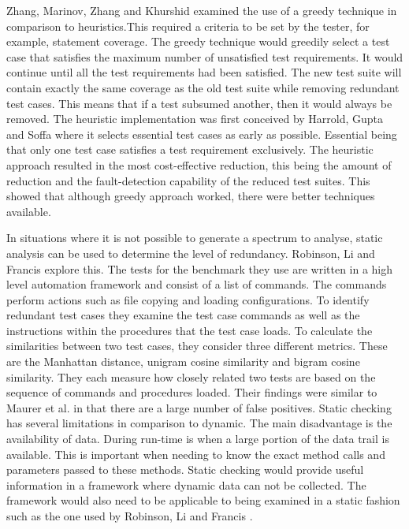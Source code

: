 Zhang, Marinov, Zhang and Khurshid \cite{zhang2011empirical} examined the use of a greedy technique in comparison to heuristics.This required a criteria to be set by the tester, for example, statement coverage. The greedy technique would greedily select a test case that satisfies the maximum number of unsatisfied test requirements. It would continue until all the test requirements had been satisfied. The new test suite will contain exactly the same coverage as the old test suite while removing redundant test cases. This means that if a test subsumed another, then it would always be removed. The heuristic implementation was first conceived by Harrold, Gupta and Soffa \cite{harrold1993methodology} where it selects essential test cases as early as possible. Essential being that only one test case satisfies a test requirement exclusively. The heuristic approach resulted in the most cost-effective reduction, this being the amount of reduction and the fault-detection capability of the reduced test suites. This showed that although greedy approach worked, there were better techniques available.

In situations where it is not possible to generate a spectrum to analyse, static analysis can be used to determine the level of redundancy. Robinson, Li and Francis \cite{li2008static} explore this. The tests for the benchmark they use are written in a high level automation framework and consist of a list of commands. The commands perform actions such as file copying and loading configurations. To identify redundant test cases they examine the test case commands as well as the instructions within the procedures that the test case loads. To calculate the similarities between two test cases, they consider three different metrics. These are the Manhattan distance, unigram cosine similarity and bigram cosine similarity. They each measure how closely related two tests are based on the sequence of commands and procedures loaded. Their findings were similar to Maurer et al. \cite{koochakzadeh2009test} in that there are a large number of false positives. Static checking has several limitations in comparison to dynamic. The main disadvantage is the availability of data. During run-time is when a large portion of the data trail is available. This is important when needing to know the exact method calls and parameters passed to these methods. Static checking would provide useful information in a framework where dynamic data can not be collected. The framework would also need to be applicable to being examined in a static fashion such as the one used by Robinson, Li and Francis \cite{li2008static}.


